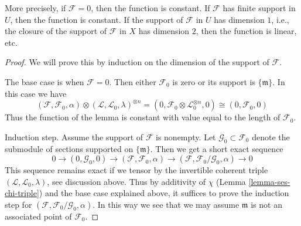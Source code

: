 \noindent
More precisely, if $\mathcal{F} = 0$, then the function is constant.
If $\mathcal{F}$ has finite support in $U$, then the function is constant.
If the support of $\mathcal{F}$ in $U$ has dimension $1$, i.e., the
closure of the support of $\mathcal{F}$ in $X$ has dimension $2$, then
the function is linear, etc.

\begin{proof}
We will prove this by induction on the dimension of the support of
$\mathcal{F}$.

\medskip\noindent
The base case is when $\mathcal{F} = 0$. Then either
$\mathcal{F}_0$ is zero or its support is $\{\mathfrak m\}$.
In this case we have
$$
(\mathcal{F}, \mathcal{F}_0, \alpha) \otimes
(\mathcal{L}, \mathcal{L}_0, \lambda)^{\otimes n} =
(0, \mathcal{F}_0 \otimes \mathcal{L}_0^{\otimes n}, 0) \cong
(0, \mathcal{F}_0, 0)
$$
Thus the function of the lemma is constant with value equal
to the length of $\mathcal{F}_0$.

\medskip\noindent
Induction step. Assume the support of $\mathcal{F}$ is nonempty.
Let $\mathcal{G}_0 \subset \mathcal{F}_0$ denote the submodule
of sections supported on $\{\mathfrak m\}$. Then we get a short
exact sequence
$$
0 \to (0, \mathcal{G}_0, 0) \to
(\mathcal{F}, \mathcal{F}_0, \alpha) \to
(\mathcal{F}, \mathcal{F}_0/\mathcal{G}_0, \alpha) \to 0
$$
This sequence remains exact if we tensor by the invertible
coherent triple $(\mathcal{L}, \mathcal{L}_0, \lambda)$, see
discussion above. Thus by additivity of $\chi$
(Lemma \ref{lemma-ses-chi-triple})
and the base case explained above, it suffices to prove
the induction step for
$(\mathcal{F}, \mathcal{F}_0/\mathcal{G}_0, \alpha)$.
In this way we see that we may assume $\mathfrak m$ is not
an associated point of $\mathcal{F}_0$.


\end{proof}
